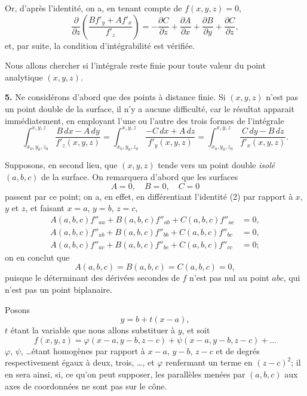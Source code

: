 \documentclass{article}
\begin{document}
Or, d'après l'identité, on a, en tenant compte de $f(x, y, z) = 0$,
\[
\frac{\partial}{\partial z} \left( \frac{B f'_{y} + A f'_{x}}{f'_{z}} \right) = - \frac{\partial C}{\partial z} + \frac{\partial A}{\partial x} + \frac{\partial B}{\partial y} + \frac{\partial C}{\partial z},
\]
et, par suite, la condition d'intégrabilité est vérifiée.

Nous allons chercher si l'intégrale reste finie pour toute valeur du point analytique $(x, y, z)$.


\textbf{5.} Ne considérons d'abord que des points à distance finie. Si $(x, y, z)$ n'est pas un point double de la surface, il n'y a aucune difficulté, car le résultat apparait immédiatement, en employant l'une ou l'autre des trois formes de l'intégrale
\[
\int_{x_{0}, y_{0}, z_{0}}^{x, y, z} \frac{B\,dx - A\,dy}{f'_{z}(x, y, z)} = \int_{x_{0}, y_{0}, z_{0}}^{x, y, z} \frac{- C\,dx + A\,dz}{f'_{y}(x, y, z)} = \int_{x_{0}, y_{0}, z_{0}}^{x, y, z} \frac{C\,dy - B\,dz}{f'_{x}(x, y, z)}.
\]

Supposons, en second lieu, que $(x, y, z)$ tende vers un point double \emph{isolé} $(a, b, c)$ de la surface. On remarquera d'abord que les surfaces
\[
A = 0, \quad B = 0, \quad C = 0
\]
passent par ce point; on a, en effet, en différentiant l'identité (2) par rapport à $x$, $y$ et $z$, et faisant $x = a$, $y = b$, $z = c$,
\[
\begin{aligned}
A(a, b, c) f''_{aa} + B(a, b, c) f''_{ab} + C(a, b, c) f''_{ac} &= 0, \\
A(a, b, c) f''_{ab} + B(a, b, c) f''_{bb} + C(a, b, c) f''_{bc} &= 0, \\
A(a, b, c) f''_{ac} + B(a, b, c) f''_{bc} + C(a, b, c) f''_{cc} &= 0;
\end{aligned}
\]
on en conclut que
\[
A(a, b, c) = B(a, b, c) = C(a, b, c) = 0,
\]
puisque le déterminant des dérivées secondes de $f$ n'est pas nul au point $abc$, qui n'est pas un point biplanaire.

Posons
\[
y = b + t(x - a),
\]
$t$ étant la variable que nous allons substituer à $y$, et soit
\[
f(x, y, z) = \varphi(x - a, y - b, z - c) + \psi(x - a, y - b, z - c) + \ldots
\]
$\varphi$, $\psi$, \ldots étant homogènes par rapport à $x - a$, $y - b$, $z - c$ et de degrés respectivement égaux à deux, trois, \ldots, et $\varphi$ renfermant un terme en $(z - c)^{2}$; il en sera ainsi, si, ce qu'on peut supposer, les parallèles menées par $(a, b, c)$ aux axes de coordonnées ne sont pas sur le cône.
\end{document}
